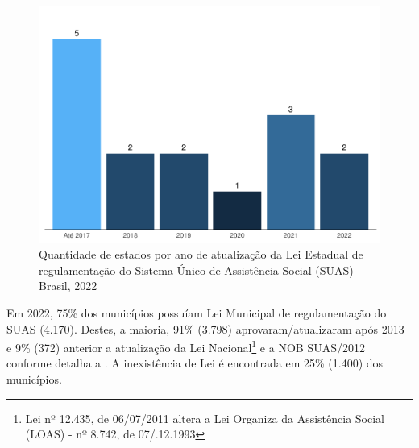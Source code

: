 \documentclass[
  brazilian]{report}
\begin{document}
\begin{figure}
\includegraphics{Censo-SUAS-2022_files/figure-latex/estados-atualizacao-lei-1} \caption[Quantidade de estados por ano de atualização da Lei Estadual de regulamentação do Sistema Único de Assistência Social (SUAS) - Brasil, 2022]{Quantidade de estados por ano de atualização da Lei Estadual de regulamentação do Sistema Único de Assistência Social (SUAS) - Brasil, 2022}\label{fig:estados-atualizacao-lei}
\end{figure}

Em 2022, 75\% dos municípios possuíam Lei Municipal de regulamentação do
SUAS (4.170). Destes, a maioria, 91\% (3.798) aprovaram/atualizaram após
2013 e 9\% (372) anterior a atualização da Lei
Nacional\footnote{Lei nº 12.435, de 06/07/2011 altera a Lei Organiza da Assistência Social (LOAS) - nº 8.742, de 07/.12.1993}
e a NOB SUAS/2012 conforme detalha a
. A inexistência de Lei é
encontrada em 25\% (1.400) dos municípios.
\end{document}
